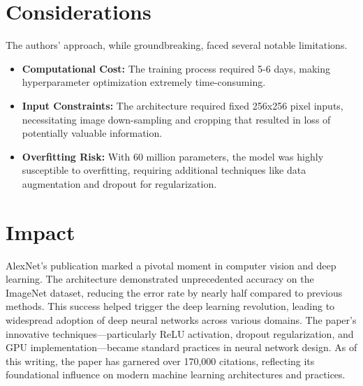 \documentclass[10pt]{article}
\begin{document}
\section*{Considerations}
The authors' approach, while groundbreaking, faced several notable limitations.

\begin{itemize}
    \item \textbf{Computational Cost:} The training process required 5-6 days, making hyperparameter optimization extremely time-consuming.

    \item \textbf{Input Constraints:} The architecture required fixed 256x256 pixel inputs, necessitating image down-sampling and cropping that resulted in loss of potentially valuable information.

    \item \textbf{Overfitting Risk:} With 60 million parameters, the model was highly susceptible to overfitting, requiring additional techniques like data augmentation and dropout for regularization.
\end{itemize}





\section*{Impact}
AlexNet's publication marked a pivotal moment in computer vision and deep learning. The architecture demonstrated unprecedented accuracy on the ImageNet dataset, reducing the error rate by nearly half compared to previous methods. This success helped trigger the deep learning revolution, leading to widespread adoption of deep neural networks across various domains. The paper's innovative techniques—particularly ReLU activation, dropout regularization, and GPU implementation—became standard practices in neural network design. As of this writing, the paper has garnered over 170,000 citations, reflecting its foundational influence on modern machine learning architectures and practices.




\end{document}
